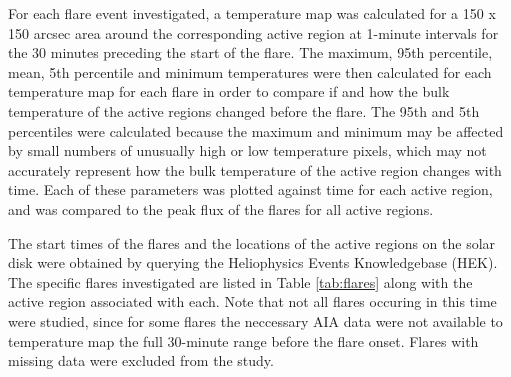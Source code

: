 \documentclass[referee,a4paper,12pt]{swsc}
\begin{document}
\begin{linenumbers}
For each flare event investigated, a temperature map was calculated for a 150 x 150 arcsec area around the corresponding active region at 1-minute intervals for the 30 minutes preceding the start of the flare.
The maximum, 95th percentile, mean, 5th percentile and minimum temperatures were then calculated for each temperature map for each flare in order to compare if and how the bulk temperature of the active regions changed before the flare.
The 95th and 5th percentiles were calculated because the maximum and minimum may be affected by small numbers of unusually high or low temperature pixels, which may not accurately represent how the bulk temperature of the active region changes with time.
Each of these parameters was plotted against time for each active region, and was compared to the peak flux of the flares for all active regions.

The start times of the flares and the locations of the active regions on the solar disk were obtained by querying the Heliophysics Events Knowledgebase (HEK).
The specific flares investigated are listed in Table \ref{tab:flares} along with the active region associated with each.
Note that not all flares occuring in this time were studied, since for some flares the neccessary AIA data were not available to temperature map the full 30-minute range before the flare onset.
Flares with missing data were excluded from the study.


\end{linenumbers}
\end{document}
